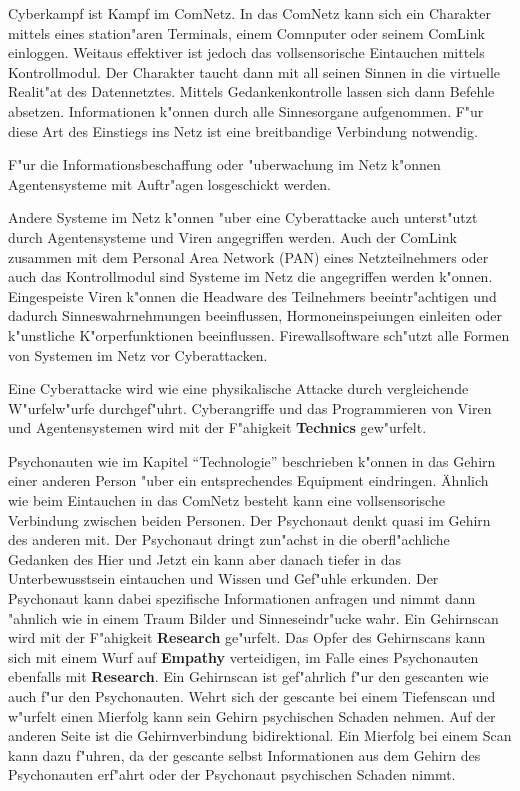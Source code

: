 Cyberkampf ist Kampf im ComNetz. In das ComNetz kann sich ein Charakter mittels eines station"aren Terminals, einem Comnputer oder seinem ComLink einloggen. Weitaus effektiver ist jedoch das vollsensorische Eintauchen mittels Kontrollmodul. Der Charakter taucht dann mit all seinen Sinnen in die virtuelle Realit"at des Datennetztes. Mittels Gedankenkontrolle lassen sich dann Befehle absetzen. Informationen k"onnen durch alle Sinnesorgane aufgenommen. F"ur diese Art des Einstiegs ins Netz ist eine breitbandige Verbindung notwendig. 

F"ur die Informationsbeschaffung oder "uberwachung im Netz k"onnen Agentensysteme mit Auftr"agen losgeschickt werden. 

Andere Systeme im Netz k"onnen "uber eine Cyberattacke auch unterst"utzt durch Agentensysteme und Viren angegriffen werden. Auch der ComLink zusammen mit dem Personal Area Network (PAN) eines Netzteilnehmers oder auch das Kontrollmodul sind Systeme im Netz die angegriffen werden k"onnen. Eingespeiste Viren k"onnen die Headware des Teilnehmers beeintr"achtigen und dadurch Sinneswahrnehmungen beeinflussen, Hormoneinspei\3ungen einleiten oder k"unstliche K"orperfunktionen beeinflussen. Firewallsoftware sch"utzt alle Formen von Systemen im Netz vor Cyberattacken.

Eine Cyberattacke wird wie eine physikalische Attacke durch vergleichende W"urfelw"urfe durchgef"uhrt. Cyberangriffe und das Programmieren von Viren und Agentensystemen wird mit der F"ahigkeit \textbf{Technics} gew"urfelt.

Psychonauten wie im Kapitel "`Technologie"' beschrieben k"onnen in das Gehirn einer anderen Person "uber ein entsprechendes Equipment eindringen. Ähnlich wie beim Eintauchen in das ComNetz besteht kann eine vollsensorische Verbindung zwischen beiden Personen. Der Psychonaut denkt quasi im Gehirn des anderen mit. Der Psychonaut dringt zun"achst in die oberfl"achliche Gedanken des Hier und Jetzt ein kann aber danach tiefer in das Unterbewusstsein eintauchen und Wissen und Gef"uhle erkunden. Der Psychonaut kann dabei spezifische Informationen anfragen und nimmt dann "ahnlich wie in einem Traum Bilder und Sinneseindr"ucke wahr. Ein Gehirnscan wird mit der F"ahigkeit \textbf{Research} ge"urfelt. Das Opfer des Gehirnscans kann sich mit einem Wurf auf \textbf{Empathy} verteidigen, im Falle eines Psychonauten ebenfalls mit \textbf{Research}. Ein Gehirnscan ist gef"ahrlich f"ur den gescanten wie auch f"ur den Psychonauten. Wehrt sich der gescante bei einem Tiefenscan und w"urfelt einen Mi\3erfolg kann sein Gehirn psychischen Schaden nehmen. Auf der anderen Seite ist die Gehirnverbindung bidirektional. Ein Mi\3erfolg bei einem Scan kann dazu f"uhren, da\3 der gescante selbst Informationen aus dem Gehirn des Psychonauten erf"ahrt oder der Psychonaut psychischen Schaden nimmt.

